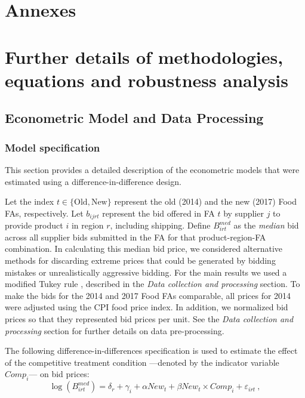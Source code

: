 \chapter*{Annexes}
\chapter*{Further details of methodologies, equations and robustness analysis}


\section{Econometric Model and Data Processing} \label{app:data}

\subsection{Model specification}
This section provides a detailed description of the econometric models that were estimated using a difference-in-difference design.

Let the index $t\in\{\text{Old},\text{New}\}$ represent the old (2014) and the new (2017) Food FAs, respectively.  Let $b_{ijrt}$ represent the bid offered in FA $t$ by supplier $j$ to provide product $i$ in region $r$, including shipping.  Define $B^{med}_{irt}$ as the \textit{median} bid across all supplier bids submitted in the FA for that product-region-FA combination. In calculating this median bid price, we considered alternative methods for discarding extreme prices that could be generated by bidding mistakes or unrealistically aggressive bidding. For the main results we used a modified Tukey rule \citep{Tukey1977}, described in the \textit{Data collection and processing} section. To make the bids for the 2014 and 2017 Food FAs comparable, all prices for 2014 were adjusted using the CPI food price index. In addition, we normalized bid prices so that they represented bid prices per unit. See the \textit{Data collection and processing} section for further details on data pre-processing. 

The following difference-in-differences specification is used to estimate the effect of the competitive treatment condition ---denoted by the indicator variable $Comp_{i}$--- on bid prices:
\begin{equation}
    \log (B^{med}_{irt}) = \delta_r + \gamma_i + \alpha New_{t} + \beta New_{t}\times Comp_{i} + \varepsilon_{irt} \ ,
    \label{eq:reg_sub_bid}
\end{equation}

